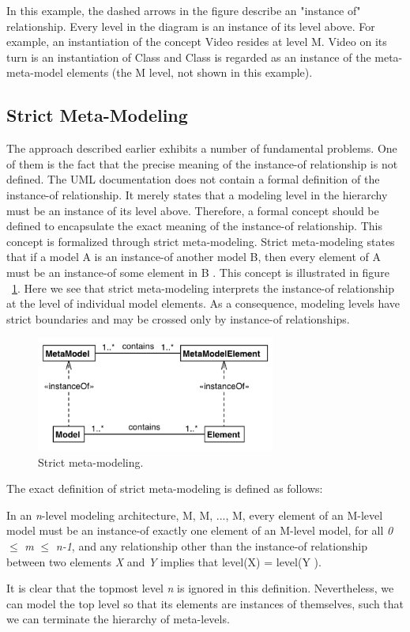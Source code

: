 In this example, the dashed arrows in the figure describe an "instance of" relationship. Every level in the diagram is an instance of its level above. For example, an instantiation of the concept Video resides at level M. Video on its turn is an instantiation of Class and Class is regarded as an instance of the meta-meta-model elements (the M level, not shown in this example).

\subsection{Strict Meta-Modeling}

The approach described earlier exhibits a number of fundamental problems. One of them is the fact that the precise meaning of the instance-of relationship is not defined. The UML documentation does not contain a formal definition of the instance-of relationship. It merely states that a modeling level in the hierarchy must be an instance of its level above. Therefore, a formal concept should be defined to encapsulate the exact meaning of the instance-of relationship. This concept is formalized through strict meta-modeling. Strict meta-modeling states that if a model A is an instance-of another model B, then every element of A must be an instance-of some element in B \cite{RearchitectingUML}. This concept is illustrated in figure ~\ref{fig:strict_mm}. Here we see that strict meta-modeling interprets the instance-of relationship at the level of individual model elements. As a consequence, modeling levels have strict boundaries and may be crossed only by instance-of relationships.
\begin{figure}[h!]
\centering
\includegraphics[width=0.7\textwidth]{images/chap2_strict_mm.png}
\caption{Strict meta-modeling.}
\label{fig:strict_mm}
\end{figure}
The exact definition of strict meta-modeling is defined as follows:
\begin{mydef}
In an \textit{n}-level modeling architecture, M, M, ..., M, every element of an M-level model must be an instance-of exactly one element of an M-level model, for all \textit{0} $\leq$ \textit{m} $\le$ \textit{n-1}, and any relationship other than the instance-of relationship between two elements \textit{X} and \textit{Y} implies that level(X) = level(Y ).
\end{mydef}
It is clear that the topmost level \textit{n} is ignored in this definition. Nevertheless, we can model the top level so that its elements are instances of themselves, such that we can terminate the hierarchy of meta-levels.

